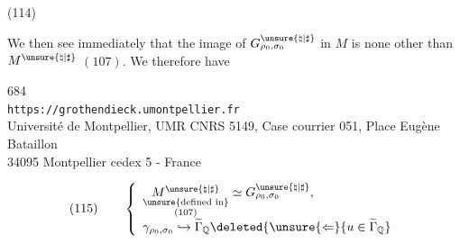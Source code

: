 \begin{samepage}
(114)\quad
{}
\end{samepage}

We then see immediately that the image of
$G_{\rho_0,\sigma_0}^{\unsure{\natural|\sharp}}$ in $M$ is none other than
$M^{\unsure{\natural|\sharp}}$ $(107)$. We therefore have


\begin{center}
684\\
\texttt{https://grothendieck.umontpellier.fr}\\
Université de Montpellier, UMR CNRS 5149, Case courrier 051, Place Eugène Bataillon\\
34095 Montpellier cedex 5 - France
\end{center}



\[
(115)\qquad
\left\{
\begin{array}{ll}
\underset{\substack{\text{\unsure{defined in}}\\(107)}}{M^{\unsure{\natural|\sharp}}}
  \simeq G_{\rho_0,\sigma_0}^{\unsure{\natural|\sharp}},\\[5pt]
\gamma_{\rho_0,\sigma_0}\hookrightarrow\widetilde{\Gamma}_{\mathbb Q}
  \deleted{\unsure{\Leftarrow}\{u\in\widetilde{\Gamma}_{\mathbb Q}}
\end{array}
\right.
\]

